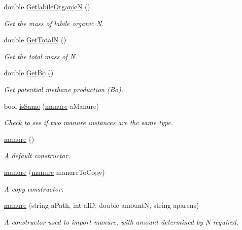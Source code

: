 \begin{DoxyCompactItemize}
double \mbox{\hyperlink{classmanure_a0bbdefcebb7c190928cb33020f90bd39}{Getlabile\+OrganicN}} ()
\begin{DoxyCompactList}\small\item\em Get the mass of labile organic N. \end{DoxyCompactList}\item 
double \mbox{\hyperlink{classmanure_a5a3323a38ff8bf4e8f45bcf7fd22f47c}{Get\+TotalN}} ()
\begin{DoxyCompactList}\small\item\em Get the total mass of N. \end{DoxyCompactList}\item 
double \mbox{\hyperlink{classmanure_ab7c3b9e8a727966f4d99548a98ae6f2a}{Get\+Bo}} ()
\begin{DoxyCompactList}\small\item\em Get potential methane production (Bo). \end{DoxyCompactList}\item 
bool \mbox{\hyperlink{classmanure_a4d39a3bf380840fb4295100fa9a476ec}{is\+Same}} (\mbox{\hyperlink{classmanure}{manure}} a\+Manure)
\begin{DoxyCompactList}\small\item\em Check to see if two manure instances are the same type. \end{DoxyCompactList}\item 
\mbox{\label{classmanure_af94ebfdf6ee55df1bf6fa835c2318ae3}} 
\mbox{\hyperlink{classmanure_af94ebfdf6ee55df1bf6fa835c2318ae3}{manure}} ()
\begin{DoxyCompactList}\small\item\em A default constructor. \end{DoxyCompactList}\item 
\mbox{\hyperlink{classmanure_a38ddb577591d36f8bd5e4c7d8fed6d51}{manure}} (\mbox{\hyperlink{classmanure}{manure}} manure\+To\+Copy)
\begin{DoxyCompactList}\small\item\em A copy constructor. \end{DoxyCompactList}\item 
\mbox{\hyperlink{classmanure_afb980a45746d9065d8c76ff38e55970a}{manure}} (string a\+Path, int a\+ID, double amountN, string aparens)
\begin{DoxyCompactList}\small\item\em A constructor used to import manure, with amount determined by N required. \end{DoxyCompactList}\item 

\end{DoxyCompactItemize}
